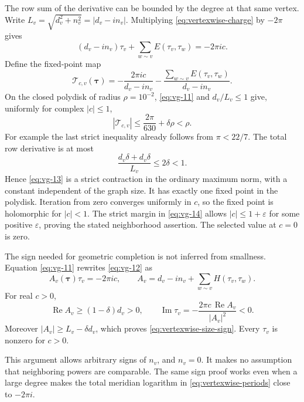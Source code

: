 The row sum of the derivative can be bounded by the degree at that
same vertex. Write
\(L_v=\sqrt{d_v^2+n_v^2}=|d_v-in_v|\). Multiplying
\eqref{eq:vertexwise-charge} by \(-2\pi\) gives
\begin{equation}\label{eq:vg-12}
(d_v-in_v)\tau_v+
       \sum_{w\sim v}E(\tau_v,\tau_w)=-2\pi ic.
\end{equation} Define the fixed-point map \begin{equation}\label{eq:vg-13}
\mathcal T_{c,v}(\boldsymbol\tau)=
       -\frac{2\pi ic}{d_v-in_v}
       -\frac{\sum_{w\sim v}E(\tau_v,\tau_w)}{d_v-in_v}.
\end{equation} On the closed polydisk of radius \(\rho=10^{-2}\), \eqref{eq:vg-11} and \(d_v/L_v\le1\) give, uniformly for complex \(|c|\le1\), \begin{equation}\label{eq:vg-14}
|\mathcal T_{c,v}|
       \le\frac{2\pi}{630}+\delta\rho<\rho.
\end{equation} For example the last strict inequality already follows from \(\pi<22/7\). The total row derivative is at most \begin{equation}\label{eq:vg-15}
\frac{d_v\delta+d_v\delta}{L_v}\le2\delta<1.
\end{equation} Hence \eqref{eq:vg-13} is a strict contraction in the ordinary maximum norm, with a constant independent of the graph size. It has exactly one fixed point in the polydisk. Iteration from zero converges uniformly in \(c\), so the fixed point is holomorphic for \(|c|<1\). The strict margin in \eqref{eq:vg-14} allows \(|c|\le1+\varepsilon\) for some positive \(\varepsilon\), proving the stated neighborhood assertion. The selected value at \(c=0\) is zero.

The sign needed for geometric completion is not inferred from smallness. Equation \eqref{eq:vg-11} rewrites \eqref{eq:vg-12} as \begin{equation}\label{eq:vg-16}
A_v(\boldsymbol\tau)\tau_v=-2\pi ic,\qquad
 A_v=d_v-in_v+\sum_{w\sim v}H(\tau_v,\tau_w).
\end{equation} For real \(c>0\), \begin{equation}\label{eq:vg-17}
\operatorname{Re}A_v\ge(1-\delta)d_v>0,\qquad
 \operatorname{Im}\tau_v
       =-\frac{2\pi c\,\operatorname{Re}A_v}{|A_v|^2}<0.
\end{equation} Moreover \(|A_v|\ge L_v-\delta d_v\), which proves \eqref{eq:vertexwise-size-sign}. Every \(\tau_v\) is nonzero for \(c>0\).

This argument allows arbitrary signs of \(n_v\), and \(n_v=0\). It makes no assumption that neighboring powers are comparable. The same sign proof works even when a large degree makes the total meridian logarithm in \eqref{eq:vertexwise-periods} close to \(-2\pi i\).

